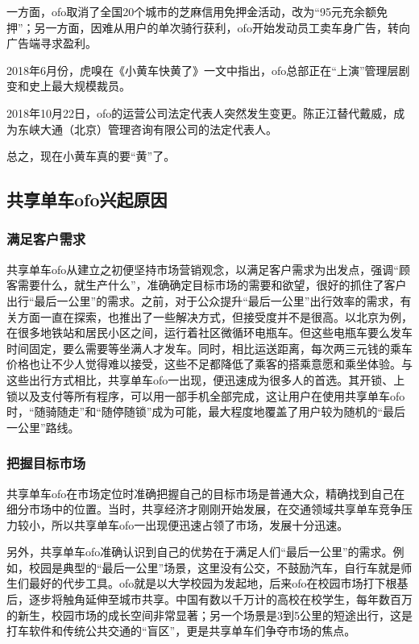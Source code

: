 \documentclass[a4paper,oneside,12pt]{article}
\begin{document}
一方面，ofo取消了全国20个城市的芝麻信用免押金活动，改为“95元充余额免押”；另一方面，因难从用户的单次骑行获利，ofo开始发动员工卖车身广告，转向广告端寻求盈利。

2018年6月份，虎嗅在《小黄车快黄了》一文中指出，ofo总部正在“上演”管理层剧变和史上最大规模裁员。

2018年10月22日，ofo的运营公司法定代表人突然发生变更。陈正江替代戴威，成为东峡大通（北京）管理咨询有限公司的法定代表人。

总之，现在小黄车真的要“黄”了。

\subsection{共享单车ofo兴起原因}

\subsubsection{满足客户需求}

共享单车ofo从建立之初便坚持市场营销观念，以满足客户需求为出发点，强调“顾客需要什么，就生产什么”，准确确定目标市场的需要和欲望，很好的抓住了客户出行“最后一公里”的需求。之前，对于公众提升“最后一公里”出行效率的需求，有关方面一直在探索，也推出了一些解决方式，但接受度并不是很高。以北京为例，在很多地铁站和居民小区之间，运行着社区微循环电瓶车。但这些电瓶车要么发车时间固定，要么需要等坐满人才发车。同时，相比运送距离，每次两三元钱的乘车价格也让不少人觉得难以接受，这些不足都降低了乘客的搭乘意愿和乘坐体验。与这些出行方式相比，共享单车ofo一出现，便迅速成为很多人的首选。其开锁、上锁以及支付等所有程序，可以用一部手机全部完成，这让用户在使用共享单车ofo时，“随骑随走”和“随停随锁”成为可能，最大程度地覆盖了用户较为随机的“最后一公里”路线。

\subsubsection{把握目标市场}
共享单车ofo在市场定位时准确把握自己的目标市场是普通大众，精确找到自己在细分市场中的位置。当时，共享经济才刚刚开始发展，在交通领域共享单车竞争压力较小，所以共享单车ofo一出现便迅速占领了市场，发展十分迅速。

另外，共享单车ofo准确认识到自己的优势在于满足人们“最后一公里”的需求。例如，校园是典型的“最后一公里”场景，这里没有公交，不鼓励汽车，自行车就是师生们最好的代步工具。ofo就是以大学校园为发起地，后来ofo在校园市场打下根基后，逐步将触角延伸至城市共享。中国有数以千万计的高校在校学生，每年数百万的新生，校园市场的成长空间非常显著；另一个场景是3到5公里的短途出行，这是打车软件和传统公共交通的“盲区”，更是共享单车们争夺市场的焦点。
\end{document}
